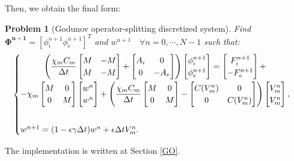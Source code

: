 \documentclass[a4paper,11pt]{article}
\newtheorem{problem}{Problem}
\begin{document}
\noindent Then, we obtain the final form:
\begin{problem}[Godunov operator-splitting discretized system] 
	Find $\bm{\Phi^{n+1}}=[\phi_i^{n+1} \phi_e^{n+1}]^T$ and $w^{n+1} \quad \forall n=0, \cdots, N-1$ such that: 
\begin{equation*}
\begin{cases}
\begin{gathered}
\left(
\frac{\chi_m C_m}{\Delta t} \begin{bmatrix}M & -M \\ M & -M\end{bmatrix}
+ \begin{bmatrix} A_i & 0 \\ 0 & -A_e \end{bmatrix}
\right) \begin{bmatrix} \phi_i^{n+1} \\ \phi_e^{n+1}  \end{bmatrix} =
\begin{bmatrix} F_i^{n+1} \\ -F_e^{n+1} \end{bmatrix} + \\-
\chi_m\begin{bmatrix} M & 0 \\ 0 & M \end{bmatrix} \begin{bmatrix} w^n \\ w^n \end{bmatrix} +
\left(\frac{\chi_mC_m}{\Delta t}\begin{bmatrix} M & 0 \\ 0 & M \end{bmatrix}
- \begin{bmatrix} C(V_m^n) & 0 \\ 0 & C(V_m^n)\end{bmatrix} 
\right) \begin{bmatrix} V_m^n \\ V_m^n \end {bmatrix},
\end{gathered} \vspace{2mm}\\ \\
w^{n+1} = (1-\epsilon \gamma \Delta t) w^n + \epsilon \Delta tV_m^n.
\end{cases}
\end{equation*}
\end{problem}\vspace{4mm}
\noindent The implementation is written at Section \ref{GO}.
\end{document}

